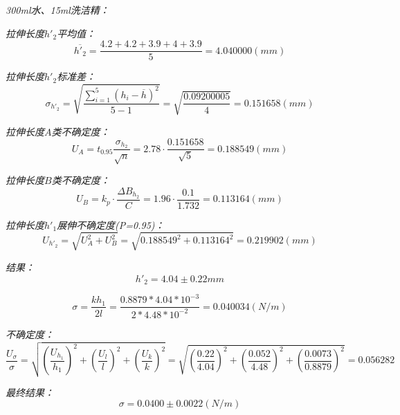 \documentclass[UTF8]{ctexart}
\begin{document}
    \begin{center}
        \emph{300ml水、15ml洗洁精：}
    \end{center}

    \emph{拉伸长度$h'_2$平均值：}
    \begin{equation*}
        \overline{h'_2}=\frac{4.2+	4.2	+3.9+	4+	3.9}{5} =4.040000(mm)
    \end{equation*}

    \emph{拉伸长度$h'_2$标准差：}
    \begin{equation*}
        \sigma _{h'_2}=\sqrt{\frac{\sum_{i=1}^5 (h_i-\overline{h})^2}{5-1}} = \sqrt{\frac{0.09200005}{4}}=0.151658(mm)
    \end{equation*}

    \emph{拉伸长度$A$类不确定度：}
    \begin{equation*}
        U_A=t_{0.95}\frac{\sigma_{h_2}}{\sqrt{n}}=2.78·\frac{0.151658}{\sqrt{5}}=0.188549(mm)
    \end{equation*}

    \emph{拉伸长度$B$类不确定度：}
    \begin{equation*}
        U_B=k_p·\frac{\varDelta B_{h_2}}{C}=1.96·\frac{0.1}{1.732}=0.113164(mm)
    \end{equation*}

    \emph{拉伸长度$h'_1$展伸不确定度(P=0.95)：}
    \begin{equation*}
       U_{h'_2}=\sqrt{U_A^2+U_B^2}=\sqrt{0.188549^2+0.113164^2}=0.219902(mm)
    \end{equation*}

    \emph{结果：}
    \begin{equation*}
        h'_2=4.04±0.22mm 
    \end{equation*} 

    \begin{equation*}
        \sigma = \frac{kh_1}{2l} = \frac{0.8879*4.04*10^{-3}}{2*4.48*10^{-2}} = 0.040034(N/m)
    \end{equation*}
    
    \emph{不确定度：}
    \begin{equation*}
        \frac{U_{\sigma}}{\sigma}=\sqrt{(\frac{U_{h_1}}{h_1})^2+(\frac{U_l}{l})^2+(\frac{U_k}{k})^2}=
        \sqrt{(\frac{0.22}{4.04})^2+(\frac{0.052}{4.48})^2+(\frac{0.0073}{0.8879})^2}= 0.056282
    \end{equation*}

    \emph{最终结果：}
    \begin{equation}
        \sigma=0.0400±0.0022(N/m)
    \end{equation}
\end{document}
